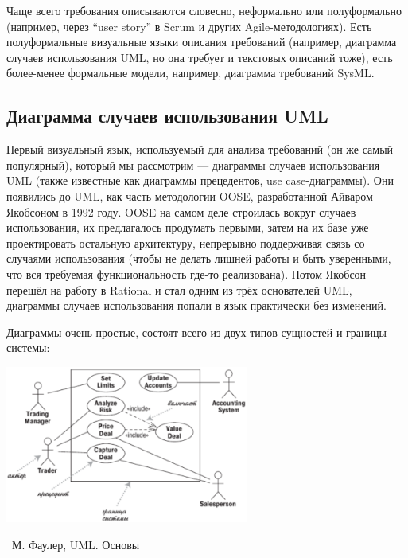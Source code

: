 \documentclass[a5paper]{article}
\newcommand{\attribution}[1] {
    \vspace{-4mm}\begin{flushright}\begin{scriptsize}%
    {\textcopyright\, #1}\end{scriptsize}\end{flushright}
}
\begin{document}
Чаще всего требования описываются словесно, неформально или полуформально (например, через ``user story'' в Scrum и других Agile-методологиях). Есть полуформальные визуальные языки описания требований (например, диаграмма случаев использования UML, но она требует и текстовых описаний тоже), есть более-менее формальные модели, например, диаграмма требований SysML.

\subsection{Диаграмма случаев использования UML}

Первый визуальный язык, используемый для анализа требований (он же самый популярный), который мы рассмотрим --- диаграммы случаев использования UML (также известные как диаграммы прецедентов, use case-диаграммы). Они появились до UML, как часть методологии OOSE, разработанной Айваром Якобсоном в 1992 году. OOSE на самом деле строилась вокруг случаев использования, их предлагалось продумать первыми, затем на их базе уже проектировать остальную архитектуру, непрерывно поддерживая связь со случаями использования (чтобы не делать лишней работы и быть уверенными, что вся требуемая функциональность где-то реализована). Потом Якобсон перешёл на работу в Rational и стал одним из трёх основателей UML, диаграммы случаев использования попали в язык практически без изменений.

Диаграммы очень простые, состоят всего из двух типов сущностей и границы системы:

\begin{center}
    \includegraphics[width=0.6\textwidth]{useCaseDiagram.png}
    \attribution{М. Фаулер, UML. Основы}
\end{center}
\end{document}
